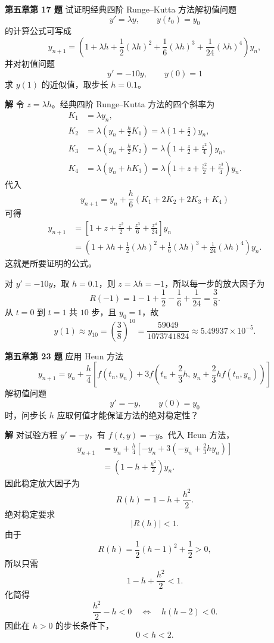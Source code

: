 \documentclass[UTF8,a4paper,11pt]{ctexart}
\begin{document}
\bigskip\bigskip

\noindent\textbf{第五章\quad 第 17 题}\quad
试证明经典四阶 Runge--Kutta 方法解初值问题
\[
  y'=\lambda y,\qquad y(t_0)=y_0
\]
的计算公式可写成
\[
  y_{n+1}=\left(
  1+\lambda h+\frac12(\lambda h)^2
  +\frac16(\lambda h)^3+\frac1{24}(\lambda h)^4
  \right)y_n,
\]
并对初值问题
\[
  y'=-10y,\qquad y(0)=1
\]
求 \(y(1)\) 的近似值，取步长 \(h=0.1\)。

\medskip
\noindent\textbf{解}\quad
令 \(z=\lambda h\)。经典四阶 Runge--Kutta 方法的四个斜率为
\[
\begin{aligned}
  K_1&=\lambda y_n,\\
  K_2&=\lambda\left(y_n+\frac h2K_1\right)
      =\lambda\left(1+\frac z2\right)y_n,\\
  K_3&=\lambda\left(y_n+\frac h2K_2\right)
      =\lambda\left(1+\frac z2+\frac{z^2}{4}\right)y_n,\\
  K_4&=\lambda\left(y_n+hK_3\right)
      =\lambda\left(1+z+\frac{z^2}{2}+\frac{z^3}{4}\right)y_n.
\end{aligned}
\]
代入
\[
  y_{n+1}=y_n+\frac h6(K_1+2K_2+2K_3+K_4)
\]
可得
\[
\begin{aligned}
  y_{n+1}
  &=\left[
  1+z+\frac{z^2}{2}+\frac{z^3}{6}+\frac{z^4}{24}
  \right]y_n \\
  &=\left(
  1+\lambda h+\frac12(\lambda h)^2
  +\frac16(\lambda h)^3+\frac1{24}(\lambda h)^4
  \right)y_n.
\end{aligned}
\]
这就是所要证明的公式。

对 \(y'=-10y\)，取 \(h=0.1\)，则 \(z=\lambda h=-1\)，所以每一步的放大因子为
\[
  R(-1)=1-1+\frac12-\frac16+\frac1{24}=\frac38.
\]
从 \(t=0\) 到 \(t=1\) 共 \(10\) 步，且 \(y_0=1\)，故
\[
  y(1)\approx y_{10}
  =\left(\frac38\right)^{10}
  =\frac{59049}{1073741824}
  \approx 5.49937\times 10^{-5}.
\]

\bigskip\bigskip

\noindent\textbf{第五章\quad 第 23 题}\quad
应用 Heun 方法
\[
  y_{n+1}=y_n+\frac h4\left[
  f(t_n,y_n)
  +3f\left(t_n+\frac23h,\,
  y_n+\frac23h f(t_n,y_n)\right)
  \right]
\]
解初值问题
\[
  y'=-y,\qquad y(0)=y_0
\]
时，问步长 \(h\) 应取何值才能保证方法的绝对稳定性？

\medskip
\noindent\textbf{解}\quad
对试验方程 \(y'=-y\)，有 \(f(t,y)=-y\)。代入 Heun 方法，
\[
\begin{aligned}
  y_{n+1}
  &=y_n+\frac h4\left[
  -y_n
  +3\left(-y_n+\frac23h y_n\right)
  \right] \\
  &=\left(1-h+\frac{h^2}{2}\right)y_n.
\end{aligned}
\]
因此稳定放大因子为
\[
  R(h)=1-h+\frac{h^2}{2}.
\]
绝对稳定要求
\[
  |R(h)|<1.
\]
由于
\[
  R(h)=\frac12(h-1)^2+\frac12>0,
\]
所以只需
\[
  1-h+\frac{h^2}{2}<1.
\]
化简得
\[
  \frac{h^2}{2}-h<0
  \quad\Longleftrightarrow\quad
  h(h-2)<0.
\]
因此在 \(h>0\) 的步长条件下，
\[
  \boxed{0<h<2.}
\]
\end{document}
